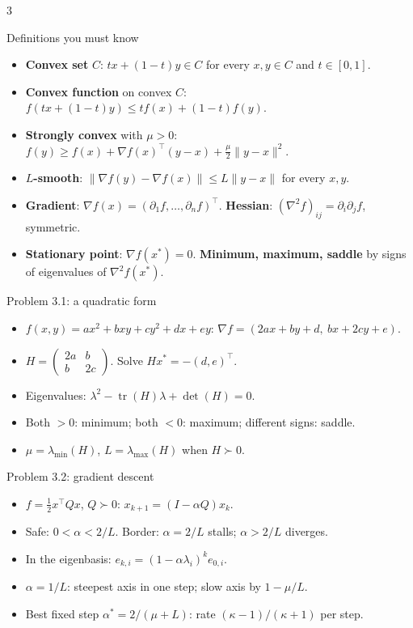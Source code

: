 \documentclass[10pt,a4paper]{article}
\makeatletter
\newcommand{\cssec}[1]{\par\addvspace{3.5pt}\noindent
  \colorbox{hselight}{\parbox{\dimexpr\linewidth-2\fboxsep}{\RaggedRight\hyphenpenalty=10000\color{hseblue}\bfseries\strut #1}}%
  \par\nobreak\vspace{1pt}\@afterheading}
\makeatother
\begin{document}
\fontsize{9}{11.4}\selectfont
\begin{multicols}{3}
\RaggedRight
\cssec{Definitions you must know}
\begin{itemize}
  \item \textbf{Convex set} $C$: $tx+(1-t)y\in C$ for every $x,y\in C$ and $t\in[0,1]$.
  \item \textbf{Convex function} on convex $C$: $f(tx+(1-t)y)\le tf(x)+(1-t)f(y)$.
  \item \textbf{Strongly convex} with $\mu>0$: $f(y)\ge f(x)+\nabla f(x)^\top(y-x)+\tfrac{\mu}{2}\|y-x\|^2$.
  \item \textbf{$L$-smooth}: $\|\nabla f(y)-\nabla f(x)\|\le L\|y-x\|$ for every $x,y$.
  \item \textbf{Gradient}: $\nabla f(x)=(\partial_1f,\dots,\partial_nf)^\top$. \textbf{Hessian}: $(\nabla^2 f)_{ij}=\partial_i\partial_j f$, symmetric.
  \item \textbf{Stationary point}: $\nabla f(x^*)=0$. \textbf{Minimum, maximum, saddle} by signs of eigenvalues of $\nabla^2 f(x^*)$.
\end{itemize}

\cssec{Problem 3.1: a quadratic form}
\begin{itemize}
  \item $f(x,y)=ax^2+bxy+cy^2+dx+ey$: $\nabla f=(2ax+by+d,\ bx+2cy+e)$.
  \item $H=\begin{pmatrix}2a&b\\b&2c\end{pmatrix}$. Solve $Hx^*=-(d,e)^\top$.
  \item Eigenvalues: $\lambda^2-\operatorname{tr}(H)\lambda+\det(H)=0$.
  \item Both $>0$: minimum; both $<0$: maximum; different signs: saddle.
  \item $\mu=\lambda_{\min}(H)$, $L=\lambda_{\max}(H)$ when $H\succ0$.
\end{itemize}

\cssec{Problem 3.2: gradient descent}
\begin{itemize}
  \item $f=\tfrac{1}{2}x^\top Qx$, $Q\succ0$: $x_{k+1}=(I-\alpha Q)x_k$.
  \item Safe: $0<\alpha<2/L$. Border: $\alpha=2/L$ stalls; $\alpha>2/L$ diverges.
  \item In the eigenbasis: $e_{k,i}=(1-\alpha\lambda_i)^k e_{0,i}$.
  \item $\alpha=1/L$: steepest axis in one step; slow axis by $1-\mu/L$.
  \item Best fixed step $\alpha^*=2/(\mu+L)$: rate $(\kappa-1)/(\kappa+1)$ per step.
\end{itemize}


\end{multicols}
\end{document}
